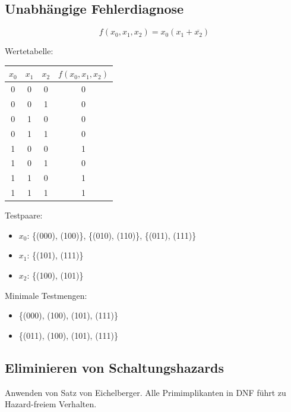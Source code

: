 \documentclass[a4paper,6pt]{article}
\begin{document}
\begin{multicols*}{3}
\scriptsize


\subsection{Unabhängige Fehlerdiagnose}
\[ f(x_0, x_1, x_2) = x_0(x_1 + \overline{x_2}) \]

\scriptsize
Wertetabelle:

\tiny
\begin{center}
    \begin{tabular}{ccc|c}
        \hline
        $x_0$ & $x_1$ & $x_2$ & $f(x_0, x_1, x_2)$ \\
        \hline
        0 & 0 & 0 & 0 \\
        0 & 0 & 1 & 0 \\
        0 & 1 & 0 & 0 \\
        0 & 1 & 1 & 0 \\
        1 & 0 & 0 & 1 \\
        1 & 0 & 1 & 0 \\
        1 & 1 & 0 & 1 \\
        1 & 1 & 1 & 1 \\
        \hline
    \end{tabular}
\end{center}


\scriptsize

Testpaare:

\begin{itemize}
    \item $x_0$: \{(000), (100)\}, \{(010), (110)\}, \{(011), (111)\}
    \item $x_1$: \{(101), (111)\}
    \item $x_2$: \{(100), (101)\}
\end{itemize}

Minimale Testmengen:

\begin{itemize}
    \item \{(000), (100), (101), (111)\}
    \item \{(011), (100), (101), (111)\}
\end{itemize}

\subsection{Eliminieren von Schaltungshazards}

Anwenden von Satz von Eichelberger. Alle Primimplikanten in DNF führt zu Hazard-freiem Verhalten.


\end{multicols*}
\end{document}
